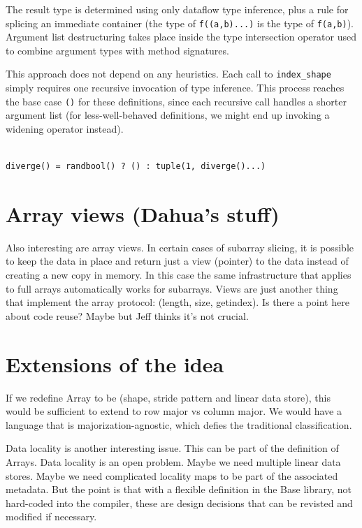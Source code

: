 \documentclass[preprint]{sigplanconf}
\begin{document}

The result type is determined using only dataflow type inference, plus a rule
for splicing an immediate container (the type of \texttt{f((a,b)...)} is the
type of \texttt{f(a,b)}). Argument list destructuring takes place inside the
type intersection operator used to combine argument types with method
signatures.

This approach does not depend on any heuristics. Each call to
\texttt{index\_shape} simply requires one recursive invocation of type
inference. This process reaches the base case \texttt{()} for these
definitions, since each recursive call handles a shorter argument list (for
less-well-behaved definitions, we might end up invoking a widening operator
instead).


\begin{verbatim}

diverge() = randbool() ? () : tuple(1, diverge()...)

\end{verbatim}

\section{Array views (Dahua's stuff)}

Also interesting are array views. In certain cases of subarray slicing, it is
possible to keep the data in place and return just a view (pointer) to the
data instead of creating a new copy in memory. In this case the same
infrastructure that applies to full arrays automatically works for subarrays.
Views are just another thing that implement the array protocol: (length, size,
getindex). Is there a point here about code reuse? Maybe but Jeff thinks it's
not crucial.


\section{Extensions of the idea}

If we redefine Array to be (shape, stride pattern and linear data store), this
would be sufficient to extend to row major vs column major. We would have a
language that is majorization-agnostic, which defies the traditional
classification.

Data locality is another interesting issue. This can be part of the definition
of Arrays. Data locality is an open problem. Maybe we need multiple linear
data stores. Maybe we need complicated locality maps to be part of the
associated metadata. But the point is that with a flexible definition in the
Base library, not hard-coded into the compiler, these are design decisions
that can be revisted and modified if necessary.
\end{document}
